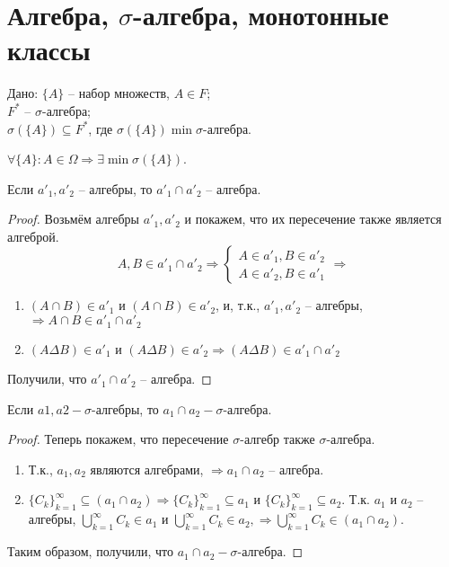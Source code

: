 \section{Алгебра, $\sigma$-алгебра, монотонные классы}

Дано: $\{A\}$ -- набор множеств, $A \in F$;\\
$F^*$ -- $\sigma$-алгебра;\\
$\sigma(\{A\}) \subseteq F^*$, где $\sigma(\{A\}) \min \sigma$-алгебра.

\begin{example}
  $ \forall \{A\}: A \in \Omega \Rightarrow \exists \min \sigma(\{A\})$.
\end{example}

\begin{proposition}
  Если $a'_1,a'_2$ -- алгебры, то $a'_1\cap a'_2$ -- алгебра.
\end{proposition}

\begin{proof}
  Возьмём алгебры $a'_1, a'_2$ и покажем, что их пересечение также является алгеброй.
  \begin{displaymath}
    A,B \in a'_1\cap a'_2 \Rightarrow \left\{
    \begin{array}{l}
      A \in a'_1, B\in a'_2\\
      A \in a'_2, B\in a'_1
    \end{array}
    \right. \Rightarrow
  \end{displaymath}

  \begin{enumerate}
    \item $(A\cap B) \in a'_1$ и $(A\cap B) \in a'_2$, и, т.к., $a'_1, a'_2$ -- алгебры, $\Rightarrow A\cap B \in a'_1\cap a'_2$
    \item $(A\Delta B)\in a'_1$ и $(A\Delta B)\in a'_2 \Rightarrow (A\Delta B)\in a'_1\cap a'_2$
  \end{enumerate}
  Получили, что $a'_1\cap a'_2$ -- алгебра.
\end{proof}

\begin{proposition}
  Если $a1,a2 - \sigma$-алгебры, то $a_1\cap a_2 - \sigma$-алгебра.
\end{proposition}

\begin{proof}
  Теперь покажем, что пересечение $\sigma$-алгебр также $\sigma$-алгебра.
  \begin{enumerate}
    \item Т.к., $a_1, a_2$ являются алгебрами, $\Rightarrow a_1\cap a_2$ -- алгебра.
    \item $\{C_k\}_{k=1}^\infty \subseteq (a_1 \cap a_2)\Rightarrow \{C_k\}_{k=1}^\infty \subseteq a_1$ и $\{C_k\}_{k=1}^\infty \subseteq a_2$. Т.к. $a_1$ и $a_2$ -- алгебры, $\bigcup\limits_{k=1}^\infty C_k \in a_1$ и $\bigcup\limits_{k=1}^\infty C_k \in a_2, \Rightarrow \bigcup\limits_{k=1}^\infty C_k \in (a_1\cap a_2)$.
  \end{enumerate}
  Таким образом, получили, что $a_1\cap a_2 - \sigma$-алгебра.
\end{proof}

